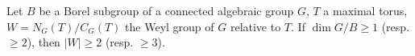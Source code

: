 Let $B$ be a Borel subgroup of a connected algebraic group $G$, $T$ a maximal torus, $W = N_G(T)/C_G(T)$ the Weyl group of $G$ relative to $T$. If $\dim G/B \geqslant 1$ (resp. $\geqslant 2$), then $|W| \geqslant 2$ (resp. $\geqslant 3$).
